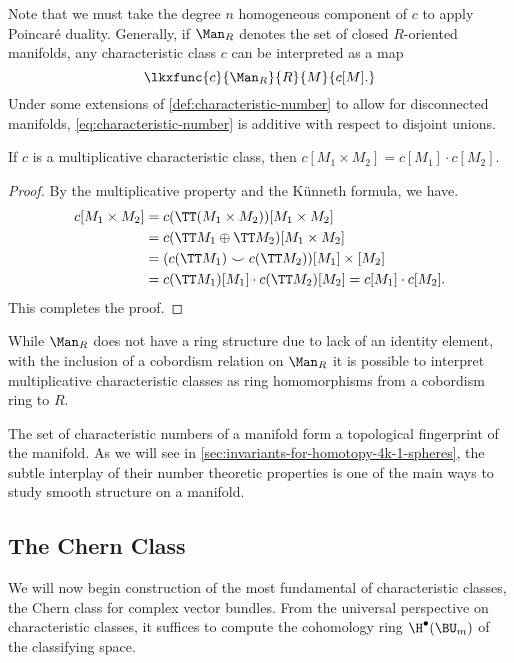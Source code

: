 Note that we must take the degree $n$ homogeneous component of $c$ to apply Poincar\'e duality. Generally, if $\Man_R$ denotes the set of closed $R$-oriented manifolds, any characteristic class $c$ can be interpreted as a map
\begin{equation}\label{eq:characteristic-number}
	\lkxfunc{c}{\Man_R}{R}{M}{c[M].}
\end{equation}
Under some extensions of \cref{def:characteristic-number} to allow for disconnected manifolds, \cref{eq:characteristic-number} is additive with respect to disjoint unions.
\begin{proposition}
	If $c$ is a multiplicative characteristic class, then $c[M_1\times M_2]=c[M_1]\cdot c[M_2]$.
\end{proposition}
\begin{proof}
	By the multiplicative property and the K\"unneth formula, we have.
	\[
		\begin{aligned}
			c[M_1\times M_2]
			 & = c(\TT (M_1\times M_2))[M_1\times M_2]                      \\
			 & = c(\TT M_1\oplus \TT M_2)[M_1\times M_2]                    \\
			 & = (c(\TT M_1)\smile c(\TT M_2))[M_1]\times [M_2]             \\
			 & = c(\TT M_1)[M_1]\cdot c(\TT M_2)[M_2] = c[M_1]\cdot c[M_2].
		\end{aligned}
	\]
	This completes the proof.
\end{proof}

\begin{remark}
	While $\Man_R$ does not have a ring structure due to lack of an identity element, with the inclusion of a cobordism relation on $\Man_R$ it is possible to interpret multiplicative characteristic classes as ring homomorphisms from a cobordism ring to $R$.
\end{remark}

The set of characteristic numbers of a manifold form a topological fingerprint of the manifold. As we will see in \cref{sec:invariants-for-homotopy-4k-1-spheres}, the subtle interplay of their number theoretic properties is one of the main ways to study smooth structure on a manifold.

\subsection{The Chern Class}\label{sec:chern-class}

We will now begin construction of the most fundamental of characteristic classes, the Chern class for complex vector bundles. From the universal perspective on characteristic classes, it suffices to compute the cohomology ring $\H^\bullet(\BU_m)$ of the classifying space. 

